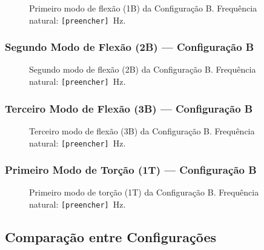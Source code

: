 \documentclass[a4paper,fleqn,noprintline]{cas-dc}
\begin{document}
\begin{figure}[h!]
    \centering
    \caption{Primeiro modo de flexão (1B) da Configuração B. 
    Frequência natural: \texttt{[preencher]}~\si{\hertz}.}
    \label{fig:modo1b}
\end{figure}

\subsubsection{Segundo Modo de Flexão (2B) --- Configuração B}

\begin{figure}[h!]
    \centering
    \caption{Segundo modo de flexão (2B) da Configuração B. 
    Frequência natural: \texttt{[preencher]}~\si{\hertz}.}
    \label{fig:modo2b}
\end{figure}

\subsubsection{Terceiro Modo de Flexão (3B) --- Configuração B}

\begin{figure}[h!]
    \centering
    \caption{Terceiro modo de flexão (3B) da Configuração B. 
    Frequência natural: \texttt{[preencher]}~\si{\hertz}.}
    \label{fig:modo3b}
\end{figure}

\subsubsection{Primeiro Modo de Torção (1T) --- Configuração B}

\begin{figure}[h!]
    \centering
    \caption{Primeiro modo de torção (1T) da Configuração B. 
    Frequência natural: \texttt{[preencher]}~\si{\hertz}.}
    \label{fig:modo_torcao_b}
\end{figure}

\subsection{Comparação entre Configurações}
\end{document}

